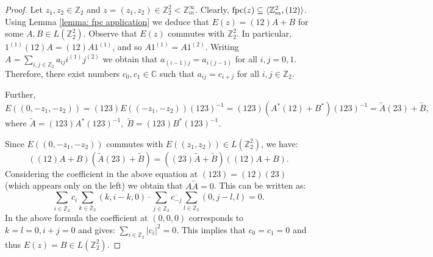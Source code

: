 \documentclass[11pt]{amsart}
\newcommand{\Z}{\mathbb Z}
\newcommand{\fpc}{{\rm fpc}}
\theoremstyle{plain}
\theoremstyle{definition}
\theoremstyle{remark}
\numberwithin{equation}{section}
\begin{document}
\begin{proof}
	Let $z_1,z_2\in\mathbb Z_2$ and $z=(z_1,z_2)\in\mathbb Z_2^2<\mathbb Z_m^\infty$. Clearly, $\fpc(z)\subseteq\langle \mathbb Z_m^2,(12)\rangle$. Using Lemma \ref{lemma: fpc application} we deduce that $E(z)=(12)A+B$ for some $A,B\in L(\mathbb Z_2^2)$.  Observe that $E(z)$ commutes with $\mathbb Z_2^2$. In particular, $1^{(1)}(12)A=(12)A1^{(1)}$, and so $A1^{(1)}=A1^{(2)}$. Writing $A=\sum\limits_{i,j\in\mathbb Z_2}a_{ij}i^{(1)}j^{(2)}$ we obtain that $a_{(i-1)j}=a_{i(j-1)}$ for all $i,j=0,1$. Therefore, there exist numbers $c_0, c_1\in\mathbb C$ such that $a_{ij}=c_{i+j}$ for all $i,j\in\mathbb Z_2$.
	
	Further, $$E((0,-z_1,-z_2))=(123) E((-z_1,-z_2))(123)^{-1}=
	(123) (A^* (12) + B^*) (123)^{-1} =
	\widetilde A   (23)+\widetilde B,$$%
	where $\widetilde A=(123)A^*(123)^{-1},\;\widetilde B=(123)B^*(123)^{-1}$. 
	
	Since $E((0,-z_1,-z_2))$ commutes with $E((z_1,z_2)) \in L(\mathbb{Z}_2^2)$, we have:
	$$((12)A+B)(\widetilde A (23)+\widetilde B)=((23)\widetilde A+\widetilde B)((12)A+B).$$%
	Considering the coefficient in the above equation at $(123)=(12)(23)$ %
	(which appears only on the left) we obtain that $A \widetilde A =0$. This can be written as:
	$$\sum\limits_{i\in\mathbb Z_2}c_i\sum\limits_{k\in\mathbb Z_2}(k,i-k,0)\cdot \sum\limits_{j\in\mathbb Z_2}\overline{c_{-j}}\sum\limits_{l\in\mathbb Z_2}(0,j-l,l)=0.$$
	In the above formula the coefficient at $(0,0,0)$ corresponds to $k=l=0,i+j=0$ and gives: $\sum_{i \in \Z_2} |c_i|^2=0$. This implies that $c_0=c_1=0$ and thus $E(z)=B\in L(\mathbb Z_2^2)$.
\end{proof}
\end{document}

